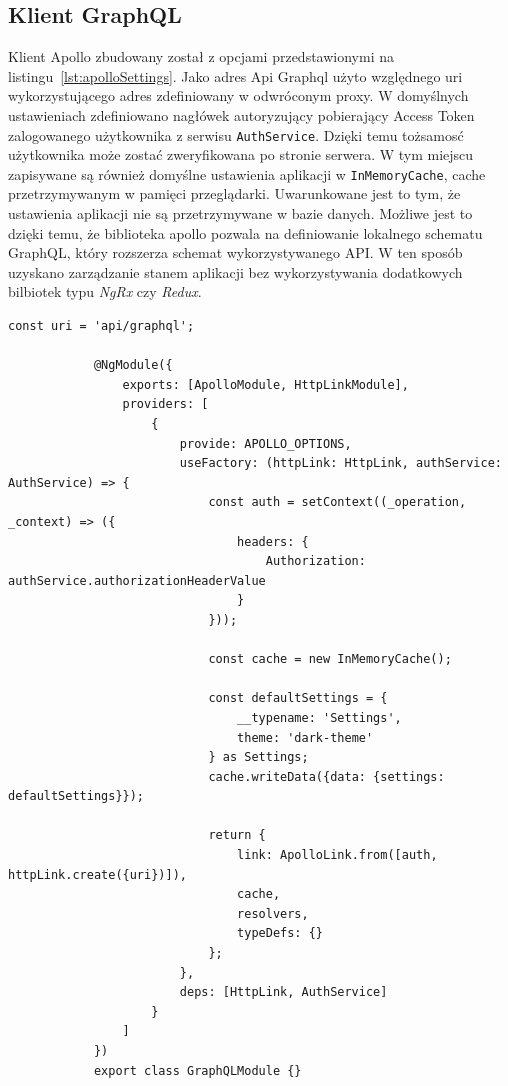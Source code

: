	\subsection{Klient GraphQL}
		Klient Apollo zbudowany został z opcjami przedstawionymi na listingu~\ref{lst:apolloSettings}.
		Jako adres Api Graphql użyto względnego uri wykorzystującego adres zdefiniowany w odwróconym proxy.
		W domyślnych ustawieniach zdefiniowano nagłówek autoryzujący pobierający Access Token zalogowanego użytkownika z serwisu \verb|AuthService|.
		Dzięki temu tożsamosć użytkownika może zostać zweryfikowana po stronie serwera.
		W tym miejscu zapisywane są również domyślne ustawienia aplikacji w \verb|InMemoryCache|, cache przetrzymywanym w pamięci przeglądarki.
		Uwarunkowane jest to tym, że ustawienia aplikacji nie są przetrzymywane w bazie danych.
		Możliwe jest to dzięki temu, że biblioteka apollo pozwala na definiowanie lokalnego schematu GraphQL, który rozszerza schemat wykorzystywanego API.
		W ten sposób uzyskano zarządzanie stanem aplikacji bez wykorzystywania dodatkowych bilbiotek typu \emph{NgRx} czy \emph{Redux}.
		\begin{lstlisting}[label=lst:apolloSettings, caption=Globalne ustawienia modułu Apollo, float]
			const uri = 'api/graphql';

			@NgModule({
				exports: [ApolloModule, HttpLinkModule],
				providers: [
					{
						provide: APOLLO_OPTIONS,
						useFactory: (httpLink: HttpLink, authService: AuthService) => {
							const auth = setContext((_operation, _context) => ({
								headers: {
									Authorization: authService.authorizationHeaderValue
								}
							}));
			
							const cache = new InMemoryCache();
			
							const defaultSettings = {
								__typename: 'Settings',
								theme: 'dark-theme'
							} as Settings;
							cache.writeData({data: {settings: defaultSettings}});
			
							return {
								link: ApolloLink.from([auth, httpLink.create({uri})]),
								cache,
								resolvers,
								typeDefs: {}
							};
						},
						deps: [HttpLink, AuthService]
					}
				]
			})
			export class GraphQLModule {}
		\end{lstlisting}

